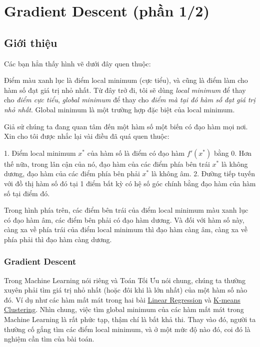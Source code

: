 \chapter{Gradient Descent (phần 1/2)}

 
 
\section{Giới thiệu}
 
Các bạn hẳn thấy hình vẽ dưới đây quen thuộc: 
 
 
Điểm màu xanh lục là điểm local minimum (cực tiểu), và cũng là điểm làm cho hàm số đạt giá trị nhỏ nhất. Từ đây trở đi, tôi sẽ dùng \textit{local minimum} để thay cho \textit{điểm cực tiểu}, \textit{global minimum} để thay cho \textit{điểm mà tại đó hàm số đạt giá trị nhỏ nhất}. Global minimum là một trường hợp đặc biệt của local minimum.  
 
Giả sử chúng ta đang quan tâm đến một hàm số một biến có đạo hàm mọi nơi. Xin cho tôi được nhắc lại vài điều đã quá quen thuộc: 
 
1. Điểm local minimum $x^*$ của hàm số là điểm có đạo hàm $f'(x^*)$ bằng 0. Hơn thế nữa, trong lân cận của nó, đạo hàm của các điểm phía bên trái $x^*$ là không dương, đạo hàm của các điểm phía bên phải $x^*$ là không âm. 
2. Đường tiếp tuyến với đồ thị hàm số đó tại 1 điểm bất kỳ có hệ số góc chính bằng đạo hàm của hàm số tại điểm đó.  
 
Trong hình phía trên, các điểm bên trái của điểm local minimum màu xanh lục có đạo hàm âm, các điểm bên phải có đạo hàm dương. Và đối với hàm số này, càng xa về phía trái của điểm local minimum thì đạo hàm càng âm, càng xa về phía phải thì đạo hàm càng dương.  
 
 
\subsection{Gradient Descent}
Trong Machine Learning nói riêng và Toán Tối Ưu nói chung, chúng ta thường xuyên phải tìm giá trị nhỏ nhất (hoặc đôi khi là lớn nhất) của một hàm số nào đó. Ví dụ như các hàm mất mát trong hai bài \href{http://machinelearningcoban.com/2016/12/28/linearregression/}{Linear Regression} và \href{http://machinelearningcoban.com/2017/01/01/kmeans/}{K-means Clustering}. Nhìn chung, việc tìm global minimum của các hàm mất mát trong Machine Learning là rất phức tạp, thậm chí là bất khả thi. Thay vào đó, người ta thường cố gắng tìm các điểm local minimum, và ở một mức độ nào đó, coi đó là nghiệm cần tìm của bài toán.  
 
